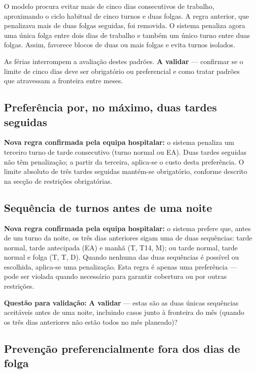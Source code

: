 \documentclass[11pt,a4paper]{article}
\newcommand{\validar}{\textcolor{blue!70!black}{\textbf{A validar}}}
\begin{document}
O modelo procura evitar mais de cinco dias consecutivos de trabalho, aproximando
o ciclo habitual de cinco turnos e duas folgas. A regra anterior, que penalizava
mais de duas folgas seguidas, foi removida. O sistema penaliza agora uma única
folga entre dois dias de trabalho e também um único turno entre duas folgas.
Assim, favorece blocos de duas ou mais folgas e evita turnos isolados.

As férias interrompem a avaliação destes padrões. \validar{} --- confirmar se o
limite de cinco dias deve ser obrigatório ou preferencial e como tratar padrões
que atravessam a fronteira entre meses.

\subsection{Preferência por, no máximo, duas tardes seguidas}

\textbf{Nova regra confirmada pela equipa hospitalar:} o sistema penaliza um
terceiro turno de tarde consecutivo (turno normal ou EA). Duas tardes seguidas
não têm penalização; a partir da terceira, aplica-se o custo desta preferência.
O limite absoluto de três tardes seguidas mantém-se obrigatório, conforme
descrito na secção de restrições obrigatórias.

\subsection{Sequência de turnos antes de uma noite}

\textbf{Nova regra confirmada pela equipa hospitalar:} o sistema prefere que,
antes de um turno da noite, os três dias anteriores sigam uma de duas
sequências: tarde normal, tarde antecipada (EA) e manhã (T, T14, M); ou tarde
normal, tarde normal e folga (T, T, D). Quando nenhuma das duas sequências é
possível ou escolhida, aplica-se uma penalização. Esta regra é apenas uma
preferência --- pode ser violada quando necessário para garantir cobertura ou
por outras restrições.

\textbf{Questão para validação:} \validar{} --- estas são as duas únicas
sequências aceitáveis antes de uma noite, incluindo casos junto à fronteira do
mês (quando os três dias anteriores não estão todos no mês planeado)?

\subsection{Prevenção preferencialmente fora dos dias de folga}
\end{document}
